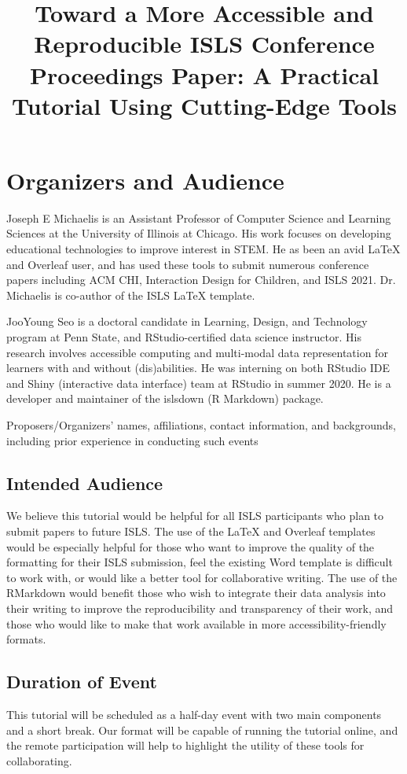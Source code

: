 \documentclass{article}
\title{Toward a More Accessible and Reproducible ISLS Conference Proceedings Paper: A Practical Tutorial Using Cutting-Edge Tools}
\author{     }
\date{     }
\begin{document}
\section{Organizers and Audience}
Joseph E Michaelis is an Assistant Professor of Computer Science and Learning Sciences at the University of Illinois at Chicago. His work focuses on developing educational technologies to improve interest in STEM. He as been an avid LaTeX and Overleaf user, and has used these tools to submit numerous conference papers including ACM CHI, Interaction Design for Children, and ISLS 2021. Dr. Michaelis is co-author of the ISLS LaTeX template.

JooYoung Seo is a doctoral candidate in Learning, Design, and Technology program at Penn State, and RStudio-certified data science instructor. His research involves accessible computing and multi-modal data representation for learners with and without (dis)abilities. He was interning on both RStudio IDE and Shiny (interactive data interface) team at RStudio in summer 2020. He is a developer and maintainer of the islsdown (R Markdown) package.

Proposers/Organizers’ names, affiliations, contact information, and backgrounds, including prior experience in conducting such events

\subsection{Intended Audience}
We believe this tutorial would be helpful for all ISLS participants who plan to submit papers to future ISLS. The use of the LaTeX and Overleaf templates would be especially helpful for those who want to improve the quality of the formatting for their ISLS submission, feel the existing Word template is difficult to work with, or would like a better tool for collaborative writing. The use of the RMarkdown would benefit those who wish to integrate their data analysis into their writing to improve the reproducibility and transparency of their work, and those who would like to make that work available in more accessibility-friendly formats.

\subsection{Duration of Event}
This tutorial will be scheduled as a half-day event with two main components and a short break. Our format will be capable of running the tutorial online, and the remote participation will help to highlight the utility of these tools for collaborating.
\end{document}
